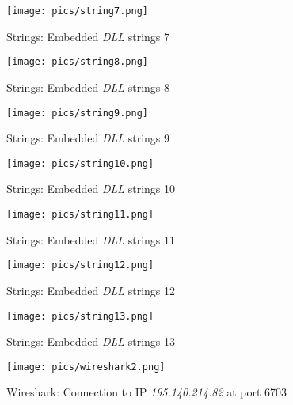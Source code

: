 \documentclass[10pt,a4paper]{article}
\begin{document}
\begin{figure}[!htbp]%
	\centering
	\texttt{[image: pics/string7.png]}
	\caption{Strings: Embedded \textit{DLL} strings 7}
	\label{string7}
\end{figure}

\begin{figure}[!htbp]%
	\centering
	\texttt{[image: pics/string8.png]}
	\caption{Strings: Embedded \textit{DLL} strings 8}
	\label{string8}
\end{figure}

\begin{figure}[!htbp]%
	\centering
	\texttt{[image: pics/string9.png]}
	\caption{Strings: Embedded \textit{DLL} strings 9}
	\label{string9}
\end{figure}

\begin{figure}[!htbp]%
	\centering
	\texttt{[image: pics/string10.png]}
	\caption{Strings: Embedded \textit{DLL} strings 10}
	\label{string10}
\end{figure}

\begin{figure}[!htbp]%
	\centering
	\texttt{[image: pics/string11.png]}
	\caption{Strings: Embedded \textit{DLL} strings 11}
	\label{string11}
\end{figure}

\begin{figure}[!htbp]%
	\centering
	\texttt{[image: pics/string12.png]}
	\caption{Strings: Embedded \textit{DLL} strings 12}
	\label{string12}
\end{figure}

\begin{figure}[!htbp]%
	\centering
	\texttt{[image: pics/string13.png]}
	\caption{Strings: Embedded \textit{DLL} strings 13}
	\label{string13}
\end{figure}

\begin{figure}[!htbp]%
	\centering
	\texttt{[image: pics/wireshark2.png]}
	\caption{Wireshark: Connection to IP \textit{195.140.214.82} at port 6703}
	\label{wireshark}
\end{figure}
\end{document}
